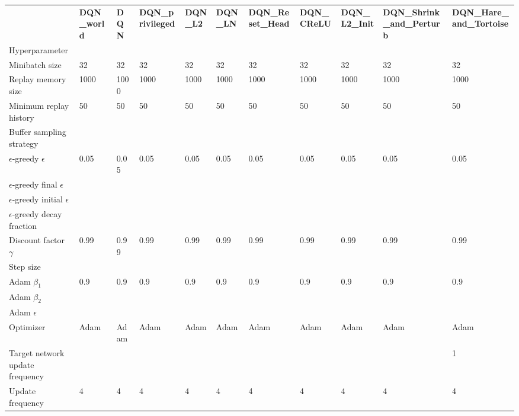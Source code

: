 \begin{tabular}{lllllllllll}
 & \bfseries DQN_world & \bfseries DQN & \bfseries DQN_privileged & \bfseries DQN_L2 & \bfseries DQN_LN & \bfseries DQN_Reset_Head & \bfseries DQN_CReLU & \bfseries DQN_L2_Init & \bfseries DQN_Shrink_and_Perturb & \bfseries DQN_Hare_and_Tortoise \\
Hyperparameter &  &  &  &  &  &  &  &  &  &  \\
Minibatch size & 32 & 32 & 32 & 32 & 32 & 32 & 32 & 32 & 32 & 32 \\
Replay memory size & 1000 & 1000 & 1000 & 1000 & 1000 & 1000 & 1000 & 1000 & 1000 & 1000 \\
Minimum replay history & 50 & 50 & 50 & 50 & 50 & 50 & 50 & 50 & 50 & 50 \\
Buffer sampling strategy &  &  &  &  &  &  &  &  &  &  \\
$\epsilon$-greedy $\epsilon$ & 0.05 & 0.05 & 0.05 & 0.05 & 0.05 & 0.05 & 0.05 & 0.05 & 0.05 & 0.05 \\
$\epsilon$-greedy final $\epsilon$ &  &  &  &  &  &  &  &  &  &  \\
$\epsilon$-greedy initial $\epsilon$ &  &  &  &  &  &  &  &  &  &  \\
$\epsilon$-greedy decay fraction &  &  &  &  &  &  &  &  &  &  \\
Discount factor $\gamma$ & 0.99 & 0.99 & 0.99 & 0.99 & 0.99 & 0.99 & 0.99 & 0.99 & 0.99 & 0.99 \\
Step size &  &  &  &  &  &  &  &  &  &  \\
Adam $\beta_1$ & 0.9 & 0.9 & 0.9 & 0.9 & 0.9 & 0.9 & 0.9 & 0.9 & 0.9 & 0.9 \\
Adam $\beta_2$ &  &  &  &  &  &  &  &  &  &  \\
Adam $\epsilon$ &  &  &  &  &  &  &  &  &  &  \\
Optimizer & Adam & Adam & Adam & Adam & Adam & Adam & Adam & Adam & Adam & Adam \\
Target network update frequency &  &  &  &  &  &  &  &  &  & 1 \\
Update frequency & 4 & 4 & 4 & 4 & 4 & 4 & 4 & 4 & 4 & 4 \\
\end{tabular}
